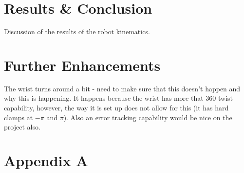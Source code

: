\documentclass[a4paper]{article}
\begin{document}
\section{Results \& Conclusion}
Discussion of the results of the robot kinematics.

\section{Further Enhancements}
The wrist turns around a bit - need to make sure that this doesn't happen and why this is happening. It happens because the wrist has more that 360 twist capability, however, the way it is set up does not allow for this (it has hard clamps at $-\pi$ and $\pi$). Also an error tracking capability would be nice on the project also.

\section{Appendix A}

\lstset{
	frame=single,
	basicstyle=\ttfamily,
	numbers=left,
	showstringspaces=false,
}

\tiny

\end{document}

